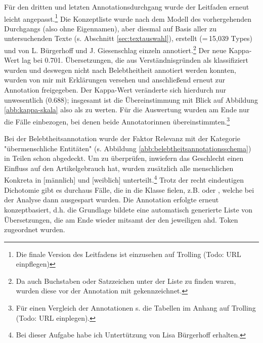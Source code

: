 Für den dritten und letzten Annotationsdurchgang wurde der Leitfaden erneut leicht angepasst.\footnote{Die finale Version des Leitfadens ist einzusehen auf Trolling (Todo: URL einpflegen)} Die Konzeptliste wurde nach dem Modell des vorhergehenden Durchgangs (also ohne Eigennamen), aber diesmal auf Basis aller zu untersuchenden Texte (s. Abschnitt \ref{sec:textauswahl}), erstellt (=\,15,039 Types) und von L. Bürgerhoff und J. Giesenschlag einzeln annotiert.\footnote{Da auch Buchstaben oder Satzzeichen unter der Liste zu finden waren, wurden diese vor der Annotation mit  gekennzeichnet.} Der neue Kappa-Wert lag bei 0.701. Übersetzungen, die aus Verständnisgründen als  klassifiziert wurden und deswegen nicht nach Belebtheitheit annotiert werden konnten, wurden von mir mit Erklärungen versehen und anschließend erneut zur Annotation freigegeben. Der Kappa-Wert veränderte sich hierdurch nur unwesentlich (0.688); insgesamt ist die Übereinstimmung mit Blick auf Abbildung \ref{abb:kappa-skala} also als   zu werten. Für die Auswertung wurden am Ende nur die Fälle einbezogen, bei denen beide Annotatorinnen übereinstimmten.\footnote{Für einen Vergleich der Annotationen s. die Tabellen im Anhang auf Trolling (Todo: URL einplegen).} 


Bei der Belebtheitsannotation wurde der Faktor Relevanz mit der Kategorie "übermenschliche Entitäten" (s. Abbildung \ref{abb:belebtheitsannotationsschema}) in Teilen schon abgedeckt. Um zu überprüfen, inwiefern das Geschlecht einen Einfluss auf den Artikelgebrauch hat, wurden zusätzlich alle menschlichen Konkreta in [männlich] und [weiblich] unterteilt.\footnote{Bei dieser Aufgabe habe ich Untertützung von Lisa Bürgerhoff erhalten.} 
Trotz der recht eindeutigen Dichotomie gibt es durchaus Fälle, die in die Klasse  fielen, z.B.  oder , welche bei der Analyse dann ausgespart wurden.  Die Annotation erfolgte erneut konzeptbasiert, d.h. die Grundlage bildete eine automatisch generierte Liste von Übersetzungen, die am Ende wieder mitsamt der  den jeweiligen ahd. Token zugeordnet wurden. 


